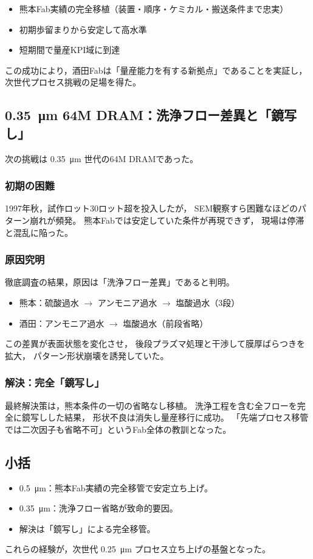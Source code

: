 \documentclass[conference]{IEEEtran}
\begin{document}
\begin{itemize}
  \item 熊本Fab実績の完全移植（装置・順序・ケミカル・搬送条件まで忠実）
  \item 初期歩留まりから安定して高水準
  \item 短期間で量産KPI域に到達
\end{itemize}

この成功により，酒田Fabは「量産能力を有する新拠点」であることを実証し，
次世代プロセス挑戦の足場を得た。

\subsection{\SI{0.35}{\micro\meter} 64M DRAM：洗浄フロー差異と「鏡写し」}
次の挑戦は \SI{0.35}{\micro\meter} 世代の64M DRAMであった。

\subsubsection*{初期の困難}
1997年秋，試作ロット30ロット超を投入したが，
SEM観察すら困難なほどのパターン崩れが頻発。
熊本Fabでは安定していた条件が再現できず，
現場は停滞と混乱に陥った。

\subsubsection*{原因究明}
徹底調査の結果，原因は「洗浄フロー差異」であると判明。  
\begin{itemize}
  \item 熊本：硫酸過水 $\rightarrow$ アンモニア過水 $\rightarrow$ 塩酸過水（3段）
  \item 酒田：アンモニア過水 $\rightarrow$ 塩酸過水（前段省略）
\end{itemize}

この差異が表面状態を変化させ，
後段プラズマ処理と干渉して膜厚ばらつきを拡大，
パターン形状崩壊を誘発していた。

\subsubsection*{解決：完全「鏡写し」}
最終解決策は，熊本条件の一切の省略なし移植。
洗浄工程を含む全フローを完全に鏡写しした結果，
形状不良は消失し量産移行に成功。
「先端プロセス移管では二次因子も省略不可」というFab全体の教訓となった。

\subsection{小括}
\begin{itemize}
  \item \SI{0.5}{\micro\meter}：熊本Fab実績の完全移管で安定立ち上げ。
  \item \SI{0.35}{\micro\meter}：洗浄フロー省略が致命的要因。
  \item 解決は「鏡写し」による完全移管。
\end{itemize}
これらの経験が，次世代 \SI{0.25}{\micro\meter} プロセス立ち上げの基盤となった。
\end{document}

